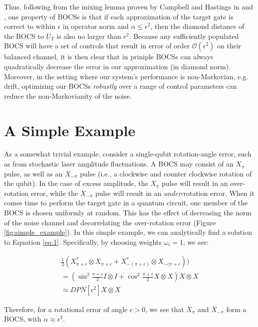\documentclass[aps,nofootinbib,pra,notitlepage,twocolumn]{revtex4-1}
\begin{document}
Thus, following from the mixing lemma proven by Campbell and Hastings in \cite{Campbell2017} and \cite{1612.01011}, one property of BOCSs is that if each approximation of the target gate is correct to within $\epsilon$ in operator norm and $\alpha\leq\epsilon^2$, then the diamond distance of the BOCS to $U_T$ is also no larger than $\epsilon^2$. Because any sufficiently populated BOCS will have a set of controls that result in error of order $\mathcal{O}(\epsilon^2)$ on their balanced channel, it is then clear that in priniple BOCSs can always quadratically decrease the error in our approximation (in diamond norm). Moreover, in the setting where our system's performance is non-Markovian, e.g. drift, optimizing our BOCSs \textit{robustly} over a range of control parameters can reduce the non-Markovianity of the noise. 

\section{A Simple Example}
As a somewhat trivial example, consider a single-qubit rotation-angle error, such as from stochastic laser amplitude fluctuations. A BOCS may consist of an $X_\pi$ pulse, as well as an $X_{-\pi}$ pulse (i.e., a clockwise and counter clockwise rotation of the qubit). In the case of excess amplitude, the $X_\pi$ pulse will result in an over-rotation error, while the $X_{-\pi}$ pulse will result in an \emph{under}-rotation error. When it comes time to perform the target gate in a quantum circuit, one member of the BOCS is chosen uniformly at random. This has the effect of decreasing the norm of the noise channel and decorrelating the over-rotation error (Figure \ref{fig:simple_example}). In this simple example, we can analytically find a solution to Equation \ref{eq:1}. Specifically, by choosing weights $\omega_i=1$, we see:

\begin{equation}
  \begin{gathered}
    \frac{1}{2}(X^*_{\pi + \epsilon}\otimes X_{\pi + \epsilon} + X^*_{-(\pi + \epsilon)}\otimes X_{-(\pi + \epsilon})) \\
    = (\sin^2{\frac{\pi + \epsilon}{2}}I\otimes I + \cos^2{\frac{\pi + \epsilon}{2}}X\otimes X)X\otimes X \\
    \approx DPN[\epsilon^2]X\otimes X
  \end{gathered}
\end{equation}

Therefore, for a rotational error of angle $\epsilon > 0$, we see that $X_\pi$ and  $X_{-\pi}$  form a BOCS, with $\alpha\approx\epsilon^2$.
\end{document}

